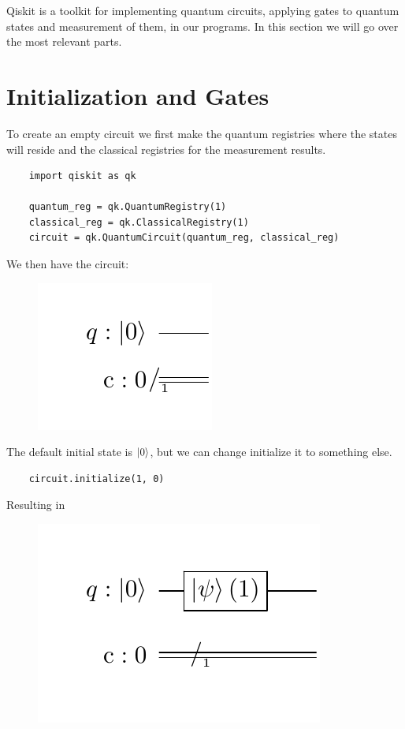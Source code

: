 Qiskit is a toolkit for implementing quantum circuits, applying gates to quantum states and measurement of them, in our programs. In this section we will go over the most relevant parts.

\section{Initialization and Gates}

To create an empty circuit we first make the quantum registries where the states will reside and the classical registries for the measurement results.


\begin{verbatim}
    import qiskit as qk

    quantum_reg = qk.QuantumRegistry(1)
    classical_reg = qk.ClassicalRegistry(1)
    circuit = qk.QuantumCircuit(quantum_reg, classical_reg)
\end{verbatim}

We then have the circuit:

\begin{figure}[H]
    \centering
    \includegraphics{Figures/Circuits/implementation/1zero.pdf}
\end{figure}

The default initial state is $\ket{0}$, but we can change initialize it to something else.

\begin{verbatim}
    circuit.initialize(1, 0)
\end{verbatim}

Resulting in

\begin{figure}[H]
    \centering
    \includegraphics{Figures/Circuits/implementation/init1.pdf}
\end{figure}

